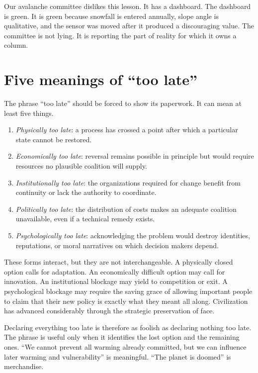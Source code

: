 \documentclass[12pt,a4paper]{book}
\begin{document}
Our avalanche committee dislikes this lesson.  It has a dashboard.  The
dashboard is green.  It is green because snowfall is entered annually, slope
angle is qualitative, and the sensor was moved after it produced a
discouraging value.  The committee is not lying.  It is reporting the part of
reality for which it owns a column.

\section{Five meanings of ``too late''}

The phrase ``too late'' should be forced to show its paperwork.  It can mean at
least five things.

\begin{enumerate}
\item \emph{Physically too late}: a process has crossed a point after which a
particular state cannot be restored.

\item \emph{Economically too late}: reversal remains possible in principle but
would require resources no plausible coalition will supply.

\item \emph{Institutionally too late}: the organizations required for change
benefit from continuity or lack the authority to coordinate.

\item \emph{Politically too late}: the distribution of costs makes an adequate
coalition unavailable, even if a technical remedy exists.

\item \emph{Psychologically too late}: acknowledging the problem would destroy
identities, reputations, or moral narratives on which decision makers depend.
\end{enumerate}

These forms interact, but they are not interchangeable.  A physically closed
option calls for adaptation.  An economically difficult option may call for
innovation.  An institutional blockage may yield to competition or exit.  A
psychological blockage may require the saving grace of allowing important
people to claim that their new policy is exactly what they meant all along.
Civilization has advanced considerably through the strategic preservation of
face.

Declaring everything too late is therefore as foolish as declaring nothing
too late.  The phrase is useful only when it identifies the lost option and
the remaining ones.  ``We cannot prevent all warming already committed, but
we can influence later warming and vulnerability'' is meaningful.  ``The
planet is doomed'' is merchandise.
\end{document}
